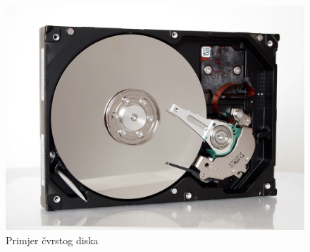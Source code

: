 \documentclass[times, utf8, zavrsni, square]{fer}
\begin{document}
\begin{figure}[h!]
    \centering
    \includegraphics[width=1\textwidth]{hdd}
    \caption{Primjer čvrstog diska}
    \label{fig:hddImage}
\end{figure} 
\FloatBarrier
\end{document}

